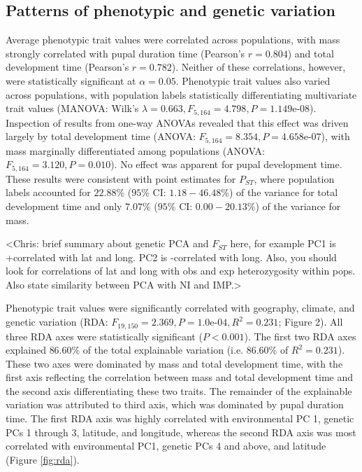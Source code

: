 \documentclass[smallextended]{svjour3}
\begin{document}
\subsection*{Patterns of phenotypic and genetic variation} Average phenotypic
trait values were correlated across populations, with mass strongly correlated
with pupal duration time (Pearson's $r = 0.804$) and total development time
(Pearson's $r = 0.782$).  Neither of these correlations, however, were
statistically significant at $\alpha = 0.05$. Phenotypic trait values also
varied across populations, with population labels statistically differentiating
multivariate trait values (MANOVA: Wilk's $\lambda = 0.663, F_{5,164} = 4.798,P
=
1.149$e-$08$). Inspection of results from one-way ANOVAs revealed that this
effect was driven largely by total development time (ANOVA: $F_{5,164} =
8.354,P =
4.658$e-$07$), with mass marginally differentiated among populations (ANOVA:
$F_{5,164} = 3.120,P = 0.010$). No effect was apparent for pupal development
time. These results were consistent with point estimates for $P_{ST}$, where
population labels accounted for $22.88\%$ ($95\%$ CI: $1.18 - 46.48\%$) of the
variance for total development time and only $7.07\%$ ($95\%$ CI: $0.00 -
20.13\%$) of the variance for mass.

<Chris: brief summary about genetic PCA and $F_{ST}$ here, for example PC1 is
+correlated with lat and long. PC2 is -correlated with long. Also, you should
look for correlations of lat and long with obs and exp heterozygosity within
pops. Also state similarity between PCA with NI and IMP.>

Phenotypic trait values were significantly correlated with geography, climate,
and genetic variation (RDA: $F_{19,150} = 2.369, P = 1.0$e-$04, R^2 = 0.231$;
Figure 2). All three RDA axes were statistically significant ($P < 0.001$). 
The first two RDA axes explained $86.60\%$ of the total
explainable variation (i.e. $86.60\%$ of $R^2 = 0.231$). These two axes were
dominated by mass and total development time, with the first axis reflecting
the
correlation between mass and total development time and the second axis
differentiating these two traits. The remainder of the explainable variation
was
attributed to third axis, which was dominated by pupal duration time. The first
RDA axis was highly correlated with environmental PC 1, genetic PCs 1 through
3,
latitude, and longitude, whereas the second RDA axis was most correlated with
environmental PC1, genetic PCs 4 and above, and latitude (Figure
\ref{fig:rda}).
\end{document}
